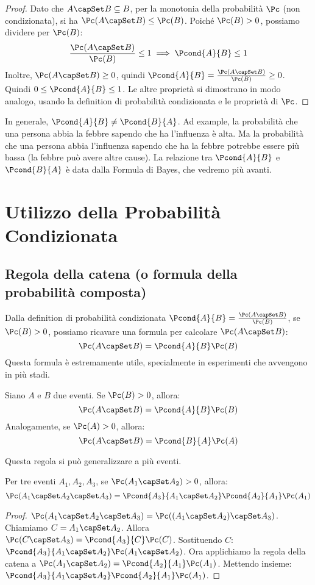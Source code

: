 \begin{proof}
Dato che $A \capSet B \subseteq B$, per la monotonia della probabilità $\Pc$ (non condizionata), si ha $\Pc(A \capSet B) \le \Pc(B)$.
Poiché $\Pc(B)>0$, possiamo dividere per $\Pc(B)$:
\[ \frac{\Pc(A \capSet B)}{\Pc(B)} \le 1 \implies \Pcond{A}{B} \le 1 \]
Inoltre, $\Pc(A \capSet B) \ge 0$, quindi $\Pcond{A}{B} = \frac{\Pc(A \capSet B)}{\Pc(B)} \ge 0$.
Quindi $0 \le \Pcond{A}{B} \le 1$. Le altre proprietà si dimostrano in modo analogo, usando la definition di probabilità condizionata e le proprietà di $\Pc$.
\end{proof}

\begin{remark}
In generale, $\Pcond{A}{B} \neq \Pcond{B}{A}$.
Ad example, la probabilità che una persona abbia la febbre sapendo che ha l'influenza è alta. Ma la probabilità che una persona abbia l'influenza sapendo che ha la febbre potrebbe essere più bassa (la febbre può avere altre cause).
La relazione tra $\Pcond{A}{B}$ e $\Pcond{B}{A}$ è data dalla Formula di Bayes, che vedremo più avanti.
\end{remark}


\section{Utilizzo della Probabilità Condizionata}

\subsection{Regola della catena (o formula della probabilità composta)}
Dalla definition di probabilità condizionata $\Pcond{A}{B} = \frac{\Pc(A \capSet B)}{\Pc(B)}$, se $\Pc(B)>0$, possiamo ricavare una formula per calcolare $\Pc(A \capSet B)$:
\[ \Pc(A \capSet B) = \Pcond{A}{B} \Pc(B) \]
Questa formula è estremamente utile, specialmente in esperimenti che avvengono in più stadi.

\begin{theorem}
Siano $A$ e $B$ due eventi. Se $\Pc(B) > 0$, allora:
\[ \Pc(A \capSet B) = \Pcond{A}{B} \Pc(B) \]
Analogamente, se $\Pc(A) > 0$, allora:
\[ \Pc(A \capSet B) = \Pcond{B}{A} \Pc(A) \]
\end{theorem}

Questa regola si può generalizzare a più eventi.
\begin{theorem}
Per tre eventi $A_1, A_2, A_3$, se $\Pc(A_1 \capSet A_2) > 0$, allora:
\[ \Pc(A_1 \capSet A_2 \capSet A_3) = \Pcond{A_3}{A_1 \capSet A_2} \Pcond{A_2}{A_1} \Pc(A_1) \]
\end{theorem}
\begin{proof}
$\Pc(A_1 \capSet A_2 \capSet A_3) = \Pc((A_1 \capSet A_2) \capSet A_3)$.
Chiamiamo $C = A_1 \capSet A_2$. Allora $\Pc(C \capSet A_3) = \Pcond{A_3}{C} \Pc(C)$.
Sostituendo $C$: $\Pcond{A_3}{A_1 \capSet A_2} \Pc(A_1 \capSet A_2)$.
Ora applichiamo la regola della catena a $\Pc(A_1 \capSet A_2) = \Pcond{A_2}{A_1} \Pc(A_1)$.
Mettendo insieme: $\Pcond{A_3}{A_1 \capSet A_2} \Pcond{A_2}{A_1} \Pc(A_1)$.
\end{proof}

